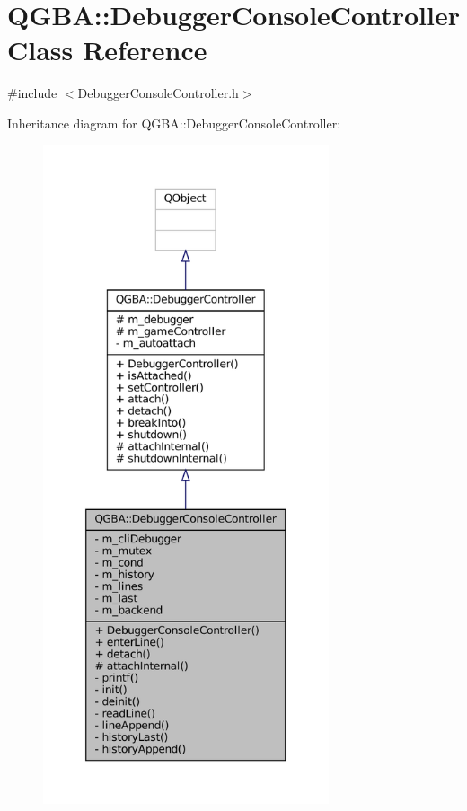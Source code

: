 \hypertarget{class_q_g_b_a_1_1_debugger_console_controller}{}\section{Q\+G\+BA\+:\+:Debugger\+Console\+Controller Class Reference}
\label{class_q_g_b_a_1_1_debugger_console_controller}


{\ttfamily \#include $<$Debugger\+Console\+Controller.\+h$>$}



Inheritance diagram for Q\+G\+BA\+:\+:Debugger\+Console\+Controller\+:
\nopagebreak
\begin{figure}[H]
\begin{center}
\leavevmode
\includegraphics[height=550pt]{class_q_g_b_a_1_1_debugger_console_controller__inherit__graph}
\end{center}
\end{figure}


